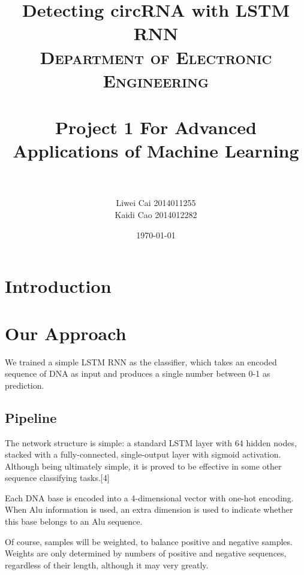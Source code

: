\documentclass[10pt,a4paper]{article}
\title{Detecting circRNA with LSTM RNN \\
\normalfont \normalsize
\textsc{Department of Electronic Engineering} \\ [25pt]
\horrule{0.5pt} \\[0.4cm] %
\huge Project 1 For Advanced Applications of Machine Learning\\ %
\horrule{2pt} \\[0.5cm] %
}
\author{ Liwei Cai 2014011255\\
	Kaidi Cao 2014012282 } %
\date{\normalsize\today} %
\begin{document}
	
\begin{spacing}{1.5}
\begin{titlepage}
\maketitle %
\end{titlepage}

\newpage

\section{Introduction}

\section{Our Approach}
We trained a simple LSTM RNN as the classifier, which takes an encoded sequence of DNA as input and produces a single number between 0-1 as prediction.
\subsection{Pipeline}
\par The network structure is simple: a standard LSTM layer with 64 hidden nodes, stacked with a fully-connected, single-output layer with sigmoid activation. Although being ultimately simple, it is proved to be effective in some other sequence classifying tasks.[4] 
\par Each DNA base is encoded into a 4-dimensional vector with one-hot encoding. When Alu information is used, an extra dimension is used to indicate whether this base belongs to an Alu sequence.
\par Of course, samples will be weighted, to balance positive and negative samples. Weights are only determined by numbers of positive and negative sequences, regardless of their length, although it may very greatly.

\end{spacing}
\end{document}
